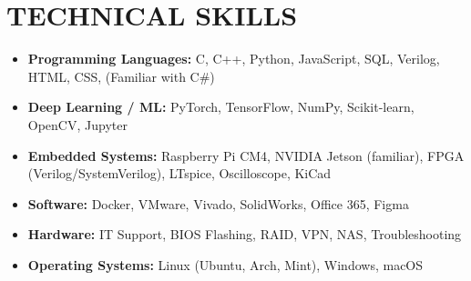\documentclass[letterpaper,11pt]{article}
\begin{document}
\section{TECHNICAL SKILLS}
\begin{itemize}
    \item \textbf{Programming Languages:} C, C++, Python, JavaScript, SQL, Verilog, HTML, CSS, (Familiar with C#)
    \item \textbf{Deep Learning / ML:} PyTorch, TensorFlow, NumPy, Scikit-learn, OpenCV, Jupyter
    \item \textbf{Embedded Systems:} Raspberry Pi CM4, NVIDIA Jetson (familiar), FPGA (Verilog/SystemVerilog), LTspice, Oscilloscope, KiCad
    \item \textbf{Software:} Docker, VMware, Vivado, SolidWorks, Office 365, Figma
    \item \textbf{Hardware:} IT Support, BIOS Flashing, RAID, VPN, NAS, Troubleshooting
    \item \textbf{Operating Systems:} Linux (Ubuntu, Arch, Mint), Windows, macOS
\end{itemize}
\end{document}

